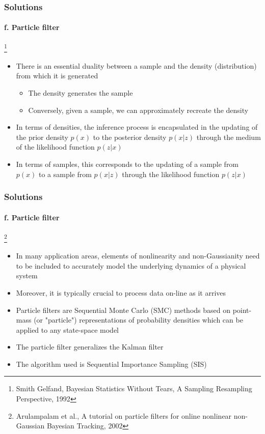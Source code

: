 \documentclass{beamer}
\begin{document}
\begin{frame}
\frametitle{Solutions}
\framesubtitle{f. Particle filter}
\mypagenum
\footnote{\tiny Smith Gelfand, Bayesian Statistics Without Tears, A Sampling Resampling Perspective, 1992}
\begin{itemize}
\item There is an essential duality between a sample and the density (distribution) from which it is generated
\begin{itemize}
\item The density generates the sample
\item Conversely, given a sample, we can approximately recreate the density
\end{itemize}
\item In terms of densities, the inference process is encapsulated in the updating of the prior density $p(x)$ to the posterior density $p(x|z)$ through the medium of the likelihood function $p(z|x)$
\item In terms of samples, this corresponds to the updating of a sample from $p(x)$ to a sample from $p(x|z)$ through the likelihood function $p(z|x)$
\end{itemize}
\end{frame}


\begin{frame}
\frametitle{Solutions}
\framesubtitle{f. Particle filter}
\mypagenum
\footnote{\tiny Arulampalam et al., A tutorial on particle filters for online nonlinear non-Gaussian Bayesian Tracking, 2002}
\begin{itemize}
\item In many application areas, elements of nonlinearity and non-Gaussianity need to be included to accurately model the underlying dynamics of a physical system
\item Moreover, it is typically crucial to process data on-line as it arrives
\item Particle filters are Sequential Monte Carlo (SMC) methods based on point-mass (or "particle") representations of probability densities which can be applied to any state-space model
\item The particle filter generalizes the Kalman filter
\item The algorithm used is Sequential Importance Sampling (SIS)
\end{itemize}
\end{frame}
\end{document}
